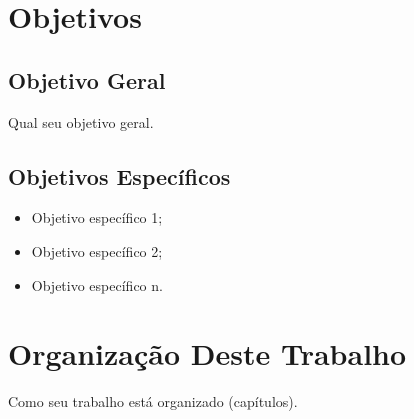 \section{Objetivos}

\subsection{Objetivo Geral}

Qual seu objetivo geral.

\subsection{Objetivos Específicos}
\begin{itemize}
	\item Objetivo específico 1;
	\item Objetivo específico 2;
	\item Objetivo específico n.
\end{itemize}



\section{Organização Deste Trabalho}

Como seu trabalho está organizado (capítulos).